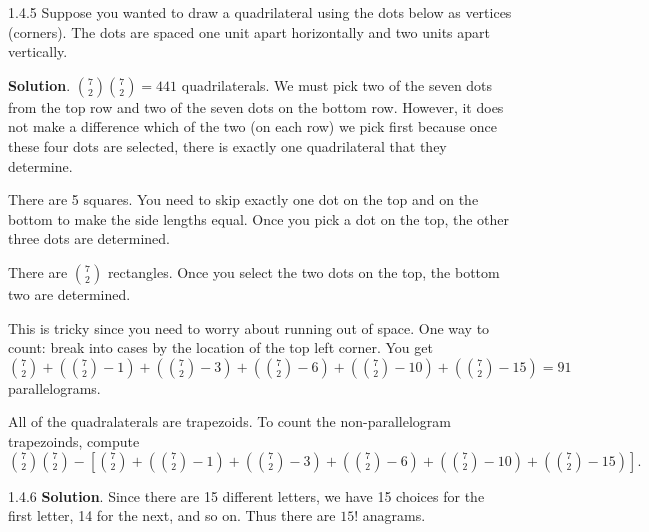 \documentclass[11pt,]{book}
\theoremstyle{ptxplainnotitle}
\theoremstyle{ptxplaintitle}
\theoremstyle{ptxdefinitionnotitle}
\theoremstyle{ptxdefinitiontitle}
\theoremstyle{ptxdefinitionnotitle}
\theoremstyle{ptxdefinitiontitle}
\theoremstyle{ptxdefinitionnotitle}
\theoremstyle{ptxdefinitiontitle}
\theoremstyle{ptxdefinitiontitlenonumber}
\theoremstyle{ptxdefinitiontitlenonumber}
\numberwithin{equation}{chapter}
\begin{document}
\begin{divisionexercise}{1.4.5}
\hypertarget{p-1611}{}%
Suppose you wanted to draw a quadrilateral using the dots below as vertices (corners).  The dots are spaced one unit apart horizontally and two units apart vertically.%
\begin{sidebyside}{1}{0.23}{0.23}{0}
\begin{sbspanel}{0.54}
\end{sbspanel}
\end{sidebyside}
\par\medskip
\textbf{Solution}.\quad%
\hypertarget{p-1641}{}%
\({7\choose 2}{7\choose 2} = 441\) quadrilaterals. We must pick two of the seven dots from the top row and two of the seven dots on the bottom row. However, it does not make a difference which of the two (on each row) we pick first because once these four dots are selected, there is exactly one quadrilateral that they determine.%
\par
\hypertarget{p-1642}{}%
There are 5 squares. You need to skip exactly one dot on the top and on the bottom to make the side lengths equal. Once you pick a dot on the top, the other three dots are determined.%
\par
\hypertarget{p-1643}{}%
There are \({7 \choose 2}\) rectangles. Once you select the two dots on the top, the bottom two are determined.%
\par
\hypertarget{p-1644}{}%
This is tricky since you need to worry about running out of space. One way to count: break into cases by the location of the top left corner. You get \({7 \choose 2} + ({7 \choose 2}-1) + ({7 \choose 2} - 3) + ({7 \choose 2} - 6) + ({7 \choose 2} - 10) + ({7 \choose 2} - 15) = 91\) parallelograms.%
\par
\hypertarget{p-1645}{}%
All of the quadralaterals are trapezoids.  To count the non-parallelogram trapezoinds, compute \({7\choose 2}{7\choose 2} - \left[ {7 \choose 2} + ({7 \choose 2}-1) + ({7 \choose 2} - 3) + ({7 \choose 2} - 6) + ({7 \choose 2} - 10) + ({7 \choose 2} - 15) \right]\text{.}\)%
\end{divisionexercise}%
\begin{divisionexercise}{1.4.6}
\textbf{Solution}.\quad%
\hypertarget{p-1651}{}%
Since there are 15 different letters, we have 15 choices for the first letter, 14 for the next, and so on. Thus there are \(15!\) anagrams.%
\end{divisionexercise}%
\end{document}
